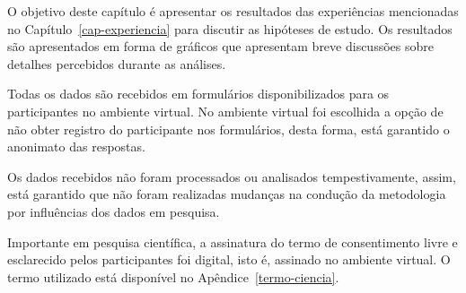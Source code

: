 \newcommand{\figuraPercepcaoParticipanteNotas}[7]{
\figuraPercepcaoParticipanteNotasBase{#1}{#2}{#3}
Podemos observar que a maioria dos participantes atribuíram
notas altas para o Problema #2 no semestre #3, assim, #7 $#4\%$ das notas
foram maiores ou iguais a $7,00$ e nenhuma nota foi menor que $#5$, com uma média
de $#6$.
}

\newcommand{\figuraPercepcaoParticipanteNotasA}[7]{
Apesar de nas afirmações de percepções o Problema #2 no semestre
#3 não ter obtido os melhores resultados, no que diz respeito
as notas para avalição dos problemas pelo participante,
#7 $#4\%$ das notas foram maiores ou iguais a $7,00$, com
uma média de $#6$.
}

\newcommand{\AvaliacaoHipoteseBase}[3]{
Para avaliação da hipótese ``#1'', referenciada na
Seção~\ref{sec-hipoteses} como item~\ref{#2} de #3, foi
considerada a favorabilidade para os resultados
de percepção dos estudantes para}

\newcommand{\AvaliacaoHipotese}[4]{
\AvaliacaoHipoteseBase{#1}{#2}{#3} a afirmativa
``#4''.
}

\newcommand{\AvaliacaoHipoteseA}[5]{
\AvaliacaoHipoteseBase{#1}{#2}{#3} as afirmativas
``#4'' e ``#5''.
}

\newcommand{\AvaliacaoHipoteseB}[6]{
\AvaliacaoHipoteseBase{#1}{#2}{#3} as afirmativas
``#4'', ``#5'' e ``#6'' .
}

\label{cap-resultados}
\acresetall

O objetivo deste capítulo é apresentar os resultados das experiências
mencionadas no Capítulo~\ref{cap-experiencia} para discutir as
hipóteses de estudo.
Os resultados são apresentados em forma de gráficos que apresentam
breve discussões sobre detalhes percebidos durante as análises.

Todas os dados são recebidos em formulários
disponibilizados para os participantes no ambiente virtual.
No ambiente virtual foi escolhida a opção de não
obter registro do participante nos formulários, desta forma,
está garantido o anonimato das respostas.

Os dados recebidos não foram processados ou analisados
tempestivamente, assim, está garantido que não foram
realizadas mudanças na condução da metodologia
por influências dos dados em pesquisa.

Importante em pesquisa científica, a assinatura do termo
de consentimento livre e esclarecido pelos participantes foi digital,
isto é, assinado no ambiente virtual.
O termo utilizado está disponível no Apêndice~\ref{termo-ciencia}.

